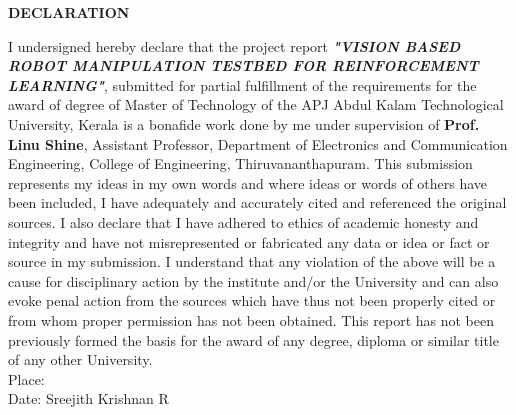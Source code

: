 \newpage
\thispagestyle{empty}
\begin{center}  {\Large \bf{DECLARATION}}\vspace{0.6cm}\end{center}
I undersigned hereby declare that the project report \emph{\textbf{"VISION BASED ROBOT MANIPULATION TESTBED FOR REINFORCEMENT LEARNING"}}, submitted for partial fulfillment of the requirements for the award of degree of Master of Technology of the APJ Abdul Kalam Technological University, Kerala is a bonafide work done by me under supervision of \textbf{Prof. Linu Shine}, Assistant Professor, Department of Electronics and Communication Engineering, College of Engineering, Thiruvananthapuram. This submission represents my ideas in my own words and where ideas or words of others have been included, I have adequately and accurately cited and referenced the original sources. I also declare that I have adhered to ethics of academic honesty and integrity and have not misrepresented or fabricated any data or idea or fact or source in my submission. I understand that any violation of the above will be a cause for disciplinary action by the institute and/or the University and can also evoke penal action from the sources which have thus not been properly cited or from whom proper permission has not been obtained. This report has not been previously formed the basis for the award of any degree, diploma or similar title of any other University.\\
\newline
Place:
\hfill
 \\
Date:
\hfill
Sreejith Krishnan R